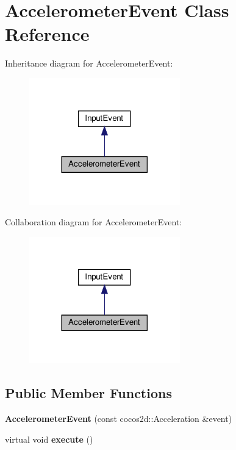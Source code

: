 \hypertarget{classAccelerometerEvent}{}\section{Accelerometer\+Event Class Reference}
\label{classAccelerometerEvent}


Inheritance diagram for Accelerometer\+Event\+:
\nopagebreak
\begin{figure}[H]
\begin{center}
\leavevmode
\includegraphics[width=185pt]{classAccelerometerEvent__inherit__graph}
\end{center}
\end{figure}


Collaboration diagram for Accelerometer\+Event\+:
\nopagebreak
\begin{figure}[H]
\begin{center}
\leavevmode
\includegraphics[width=185pt]{classAccelerometerEvent__coll__graph}
\end{center}
\end{figure}
\subsection*{Public Member Functions}
\begin{DoxyCompactItemize}
\item 
\mbox{\label{classAccelerometerEvent_a3a73ec343c195221204bba0658a3cf7d}} 
{\bfseries Accelerometer\+Event} (const cocos2d\+::\+Acceleration \&event)
\item 
\mbox{\label{classAccelerometerEvent_aa6e6e4422da9068659413756b473e343}} 
virtual void {\bfseries execute} ()
\end{DoxyCompactItemize}


